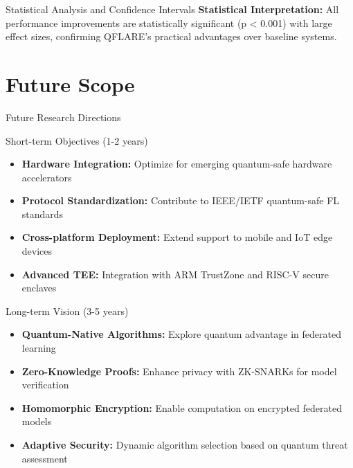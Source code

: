 \documentclass[aspectratio=169,11pt]{beamer}
\newcommand{\highlight}[1]{\textcolor{qflareblue}{\textbf{#1}}}
\begin{document}
\begin{frame}{Statistical Analysis and Confidence Intervals}
\textbf{Statistical Interpretation:} All performance improvements are statistically significant (p < 0.001) with large effect sizes, confirming QFLARE's practical advantages over baseline systems.

\end{frame}

\section{Future Scope}
\begin{frame}{Future Research Directions}

\begin{block}{Short-term Objectives (1-2 years)}
\begin{itemize}
\item \highlight{Hardware Integration:} Optimize for emerging quantum-safe hardware accelerators
\item \highlight{Protocol Standardization:} Contribute to IEEE/IETF quantum-safe FL standards
\item \highlight{Cross-platform Deployment:} Extend support to mobile and IoT edge devices
\item \highlight{Advanced TEE:} Integration with ARM TrustZone and RISC-V secure enclaves
\end{itemize}
\end{block}

\begin{block}{Long-term Vision (3-5 years)}
\begin{itemize}
\item \highlight{Quantum-Native Algorithms:} Explore quantum advantage in federated learning
\item \highlight{Zero-Knowledge Proofs:} Enhance privacy with ZK-SNARKs for model verification
\item \highlight{Homomorphic Encryption:} Enable computation on encrypted federated models
\item \highlight{Adaptive Security:} Dynamic algorithm selection based on quantum threat assessment
\end{itemize}
\end{block}


\end{frame}
\end{document}
